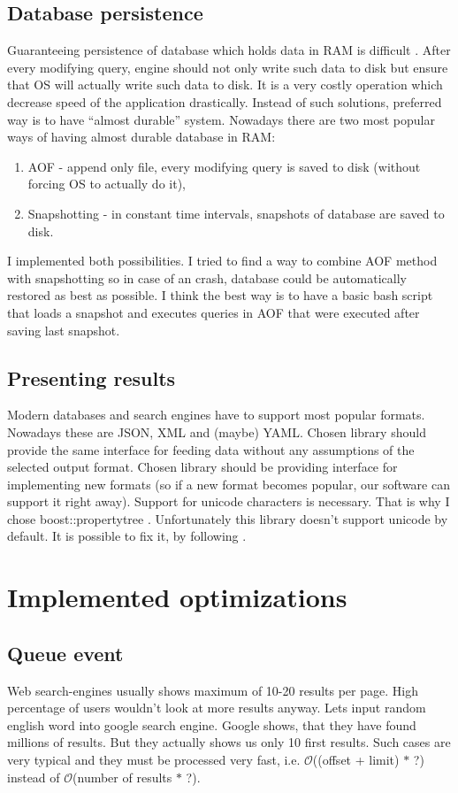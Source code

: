 \documentclass[10pt,a4paper]{article}
\newcommand{\Oh}{\mathcal{O}}
\begin{document}
\subsection{Database persistence}
Guaranteeing persistence of database which holds data in RAM is difficult \cite{REDPE} . After every modifying query, engine should not only write such data to disk but ensure that OS will actually write such data to disk. It is a very costly operation which decrease speed of the application drastically. Instead of such solutions, preferred way is to have “almost durable” system.
Nowadays there are two most popular ways of having almost durable database in RAM:

\begin{enumerate}
\item AOF - append only file, every modifying query is saved to disk (without forcing OS to actually do it),
\item Snapshotting - in constant time intervals, snapshots of database are saved to disk.
\end{enumerate}
I implemented both possibilities. I tried to find a way to combine AOF method with snapshotting so in case of an crash, database could be automatically restored as best as possible. I think the best way is to have a basic bash script that loads a snapshot and executes queries in AOF that were executed after saving last snapshot.

\subsection{Presenting results}
Modern databases and search engines have to support most popular formats. Nowadays these are
JSON, XML and (maybe) YAML. Chosen library should provide the same interface for feeding data without any assumptions of the selected output format. Chosen library should be providing interface for implementing new formats (so if a new format becomes popular, our software can support it right away). Support for unicode characters is necessary. That is why I chose boost::property\textunderscore tree . 
Unfortunately this library doesn't support unicode by default. It is possible to fix it, by following \cite{SOANS} .

\section{Implemented optimizations}
\subsection{Queue event}
Web search-engines usually shows maximum of 10-20 results per page. High percentage of users wouldn't look at more results anyway. Lets input random english word into google search engine. Google shows, that they have found millions of results. But they actually shows us only 10 first results. Such cases are very typical and they must be processed very fast, i.e. $\Oh$((offset + limit) $*$ ?) instead of $\Oh$(number of results $*$ ?).
\end{document}
